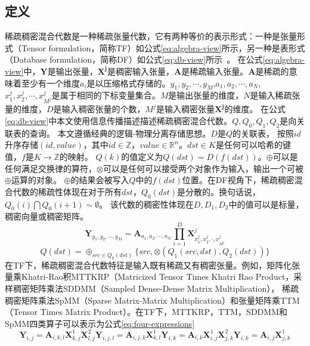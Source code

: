 \subsection{定义}
稀疏稠密混合代数是一种稀疏张量代数，它有两种等价的表示形式：一种是张量形式（Tensor formulation，简称TF）如公式\eqref{eq:algebra-view}所示，另一种是表形式（Database formulation，简称DF）如公式\eqref{eq:db-view}所示~\cite{zhang2023sgap}。
在公式\eqref{eq:algebra-view}中，$\symbf{Y}$是输出张量，$\symbf{X^j}$是稠密输入张量，$\symbf{A}$是稀疏输入张量。$\symbf{A}$是稀疏的意味着至少有一个维度$a_i$是以压缩格式存储的。$y_1, y_2,\cdots,y_M$,$a_1, a_2,\cdots,a_N$,$x_1^j,x_2^j,\cdots,x_{M^j}^j$是属于相同的下标变量集合。$M$是输出张量的维度，$N$是输入稀疏张量的维度，$D$是输入稠密张量的个数，$M^j$是输入稠密张量$\symbf{X^j}$的维度。
在公式\eqref{eq:db-view}中本文使用信息传播描述描述稀疏稠密混合代数。$Q,Q_0,Q_1,Q_2$是向关联表的查询。
本文遵循经典的逻辑-物理分离存储思想\cite{codd1970relational}。$D$是$Q$的关联表，
按照$id$升序存储$(id, value)$，其中$id\in \mathbb{Z}$，$value \in \mathbb{R}^n$。$dst\in K$是任何可以哈希的键值，$f$是$K\rightarrow \mathbb{Z}$的映射。
$Q(k)$的值定义为$Q(dst)=D(f(dst))$。$\oplus$可以是任何满足交换律的算符，$\otimes$可以是任何可以接受两个对象作为输入，输出一个可被$\oplus$运算的对象。
$\oplus$的结果会被写入$Q$中的$f(dst)$位置。在DF视角下，稀疏稠密混合代数的稀疏性体现在对于所有$dst$，$Q_0(dst)$是分散的。换句话说，$Q_0(i) \bigcap Q_0(i+1) \sim \emptyset $。
该代数的稠密性体现在$D,D_1,D_2$中的值可以是标量，稠密向量或稠密矩阵。
\begin{equation}
  \symbf{Y}_{y_1, y_2,\cdots,y_M} = \symbf{A}_{a_1, a_2,\cdots,a_N}\prod_{i=1}^{D}\symbf{X}^{j}_{x_1^j,x_2^j,\cdot,x_{M^j}^j}
  \label{eq:algebra-view}
\end{equation}
\begin{equation}
  Q(dst)=\oplus_{src\in Q_0(dst)}\{src, \otimes(Q_1(src,dst), Q_2(dst))\}
  \label{eq:db-view}
\end{equation}
在TF下，稀疏稠密混合代数特征是输入既有稀疏又有稠密张量。例如，矩阵化张量乘Khatri-Rao积MTTKRP（Matricized Tensor Times Khatri Rao Product\cite{nisa2019mttkrp}，采样稠密矩阵乘法SDDMM（Sampled Dense-Dense Matrix Multiplication）\cite{yu2021exploiting}，
稀疏稠密矩阵乘法SpMM（Sparse Matrix-Matrix Multiplication）\cite{huang2020ge}和张量矩阵乘TTM（Tensor Times Matrix Product）\cite{kurt2022ttm}。在TF下，MTTKRP，TTM，SDDMM和SpMM四类算子可以表示为公式\eqref{eq:four-expressions}
\begin{subequations}
  \begin{equation}
      \symbf{Y}_{i,j} = \symbf{A}_{i,k,l}\symbf{X}_{k,j}^1\symbf{X}_{l,j}^2
  \end{equation}
  \begin{equation}
      \symbf{Y}_{i,j,l} = \symbf{A}_{i,j,k}\symbf{X}_{k,l}^1
  \end{equation}
  \begin{equation}
      \symbf{Y}_{i,k} = \symbf{A}_{i,k}\symbf{X}_{i,j}^1\symbf{X}_{j,k}^2
  \end{equation}
  \begin{equation}
      \symbf{Y}_{i,k} = \symbf{A}_{i,j}\symbf{X}_{j,k}^1
  \end{equation}
  \label{eq:four-expressions}
\end{subequations}

